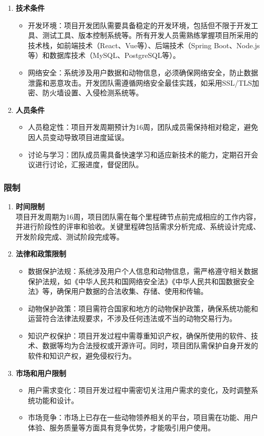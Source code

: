 \documentclass[12pt,a4paper,UTF8]{article}
\begin{document}
\begin{enumerate}
  \item \textbf{技术条件} 
  \begin{itemize}
    \item 开发环境：项目开发团队需要具备稳定的开发环境，包括但不限于开发工具、测试工具、版本控制系统等。所有开发人员需熟练掌握项目所采用的技术栈，如前端技术（React、Vue等）、后端技术（Spring Boot、Node.js等）和数据库技术（MySQL、PostgreSQL等）。
    \item 网络安全：系统涉及用户数据和动物信息，必须确保网络安全，防止数据泄露和恶意攻击。开发团队需遵循网络安全最佳实践，如采用SSL/TLS加密、防火墙设置、入侵检测系统等。
  \end{itemize}
  \item \textbf{人员条件}
  \begin{itemize}
    \item 人员稳定性：项目开发周期预计为16周，团队成员需保持相对稳定，避免因人员变动导致项目进度延误。
    \item 讨论与学习：团队成员需具备快速学习和适应新技术的能力，定期召开会议进行讨论，汇报进度，督促团队。
  \end{itemize}
\end{enumerate}

\subsubsection{限制}

\begin{enumerate}
  \item \textbf{时间限制} \\
  项目开发周期为16周，项目团队需在每个里程碑节点前完成相应的工作内容，并进行阶段性的评审和验收。关键里程碑包括需求分析完成、系统设计完成、开发阶段完成、测试阶段完成等。
  \item \textbf{法律和政策限制}
  \begin{itemize}
    \item 数据保护法规：系统涉及用户个人信息和动物信息，需严格遵守相关数据保护法规，如《中华人民共和国网络安全法》《中华人民共和国数据安全法》等，确保用户数据的合法收集、存储、使用和传输。
    \item 动物保护政策：项目需符合国家和地方的动物保护政策，确保系统功能和运营符合法律法规要求，不涉及任何违法或不当的动物交易行为。
    \item 知识产权保护：项目开发过程中需尊重知识产权，确保所使用的软件、技术、数据等均为合法授权或开源许可。同时，项目团队需保护自身开发的软件和知识产权，避免侵权行为。
  \end{itemize}
  \item \textbf{市场和用户限制}
  \begin{itemize}
    \item 用户需求变化：项目开发过程中需密切关注用户需求的变化，及时调整系统功能和设计。
    \item 市场竞争：市场上已存在一些动物领养相关的平台，项目需在功能、用户体验、服务质量等方面具有竞争优势，才能吸引用户使用。
  \end{itemize}
\end{enumerate}
\end{document}
